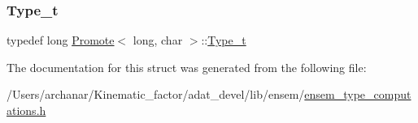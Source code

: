 \subsubsection{\texorpdfstring{Type\_t}{Type\_t}\hspace{0.1cm}{\footnotesize\ttfamily [2/2]}}
{\footnotesize\ttfamily typedef long \mbox{\hyperlink{structPromote}{Promote}}$<$ long, char $>$\+::\mbox{\hyperlink{structPromote_3_01long_00_01char_01_4_a04c143edd9915a489849f8e7da76543d}{Type\+\_\+t}}}



The documentation for this struct was generated from the following file\+:\begin{DoxyCompactItemize}
\item 
/\+Users/archanar/\+Kinematic\+\_\+factor/adat\+\_\+devel/lib/ensem/\mbox{\hyperlink{lib_2ensem_2ensem__type__computations_8h}{ensem\+\_\+type\+\_\+computations.\+h}}\end{DoxyCompactItemize}
